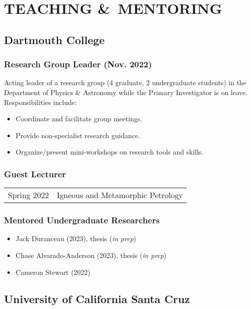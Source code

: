 \section*{TEACHING \&\ MENTORING}
\subsection*{\textbf{Dartmouth College}}
\subsubsection*{Research Group Leader (Nov. 2022\ongoing)}
Acting leader of a research group (4 graduate, 2 undergraduate students) in the Department of Physics \& Astronomy while the Primary Investigator is on leave. Responsibilities include:
\begin{itemize}
\item Coordinate and facilitate group meetings.
\item Provide non-specialist research guidance.
\item Organize/present mini-workshops on research tools and skills.
\end{itemize}
\subsubsection*{Guest Lecturer}
\begin{tabular}{p{.15\linewidth} p{.85\linewidth}} %
Spring 2022 & Igneous and Metamorphic Petrology
\end{tabular}

\subsubsection*{Mentored Undergraduate Researchers}
\begin{itemize}
	\item Jack Duranceau (2023), thesis (\textit{in prep})
	\item Chase Alvarado-Anderson (2023), thesis (\textit{in prep})
	\item Cameron Stewart (2022)
\end{itemize}

\subsection*{\textbf{University of California Santa Cruz}}
